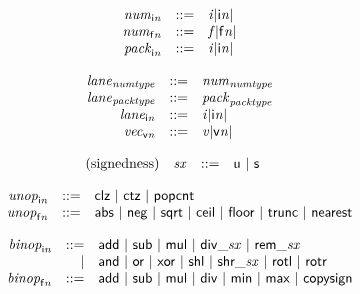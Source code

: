\vspace{1ex}

\vspace{1ex}

\vspace{1ex}

$$
\begin{array}{@{}lrrl@{}l@{}}
& {{\mathit{num}}}_{{\mathsf{i}}{{\mathit{n}}}} &::=& {{\mathit{i}}}{{|{\mathsf{i}}{{\mathit{n}}}|}} \\
& {{\mathit{num}}}_{{\mathsf{f}}{{\mathit{n}}}} &::=& {{\mathit{f}}}{{|{\mathsf{f}}{{\mathit{n}}}|}} \\
& {{\mathit{pack}}}_{{\mathsf{i}}{{\mathit{n}}}} &::=& {{\mathit{i}}}{{|{\mathsf{i}}{{\mathit{n}}}|}} \\
\end{array}
$$

$$
\begin{array}{@{}lrrl@{}l@{}}
& {{\mathit{lane}}}_{{\mathit{numtype}}} &::=& {{\mathit{num}}}_{{\mathit{numtype}}} \\
& {{\mathit{lane}}}_{{\mathit{packtype}}} &::=& {{\mathit{pack}}}_{{\mathit{packtype}}} \\
& {{\mathit{lane}}}_{{\mathsf{i}}{{\mathit{n}}}} &::=& {{\mathit{i}}}{{|{\mathsf{i}}{{\mathit{n}}}|}} \\
& {{\mathit{vec}}}_{{\mathsf{v}}{{\mathit{n}}}} &::=& {{\mathit{v}}}{{|{\mathsf{v}}{{\mathit{n}}}|}} \\
\end{array}
$$

\vspace{1ex}

$$
\begin{array}{@{}lrrl@{}l@{}}
\mbox{(signedness)} & {\mathit{sx}} &::=& \mathsf{u} ~|~ \mathsf{s} \\
\end{array}
$$

$$
\begin{array}{@{}lrrl@{}l@{}}
& {{\mathit{unop}}}_{{\mathsf{i}}{{\mathit{n}}}} &::=& \mathsf{clz} ~|~ \mathsf{ctz} ~|~ \mathsf{popcnt} \\
& {{\mathit{unop}}}_{{\mathsf{f}}{{\mathit{n}}}} &::=& \mathsf{abs} ~|~ \mathsf{neg} ~|~ \mathsf{sqrt} ~|~ \mathsf{ceil} ~|~ \mathsf{floor} ~|~ \mathsf{trunc} ~|~ \mathsf{nearest} \\
\end{array}
$$

$$
\begin{array}{@{}lrrl@{}l@{}}
& {{\mathit{binop}}}_{{\mathsf{i}}{{\mathit{n}}}} &::=& \mathsf{add} ~|~ \mathsf{sub} ~|~ \mathsf{mul} ~|~ {\mathsf{div\_}}{{\mathit{sx}}} ~|~ {\mathsf{rem\_}}{{\mathit{sx}}} \\ &&|&
\mathsf{and} ~|~ \mathsf{or} ~|~ \mathsf{xor} ~|~ \mathsf{shl} ~|~ {\mathsf{shr\_}}{{\mathit{sx}}} ~|~ \mathsf{rotl} ~|~ \mathsf{rotr} \\
& {{\mathit{binop}}}_{{\mathsf{f}}{{\mathit{n}}}} &::=& \mathsf{add} ~|~ \mathsf{sub} ~|~ \mathsf{mul} ~|~ \mathsf{div} ~|~ \mathsf{min} ~|~ \mathsf{max} ~|~ \mathsf{copysign} \\
\end{array}
$$

